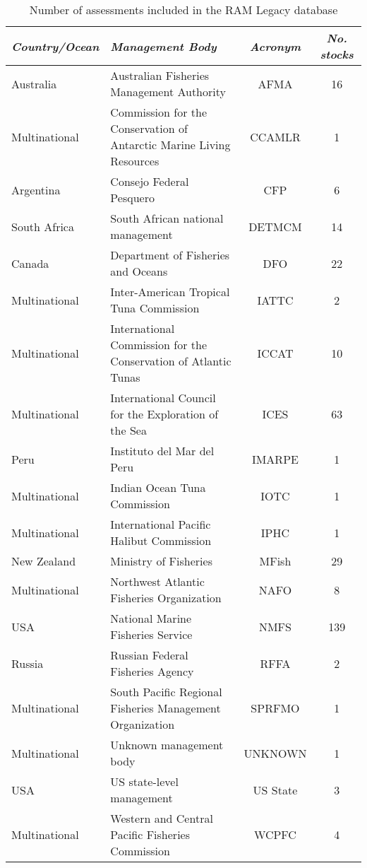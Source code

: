 \begin{table}[ht]
\begin{center}
\caption{Number of assessments included in the RAM Legacy database}
\label{tab:mgmt}
\begin{tabular}{p{3cm}p{5cm}cc}
\textit{Country/Ocean} & \textit{Management Body} & \textit{Acronym} & \textit{No. stocks} \\ \midrule
Australia & Australian Fisheries Management Authority & AFMA &  16 \\ 
  Multinational & Commission for the Conservation of Antarctic Marine Living Resources & CCAMLR &   1 \\ 
  Argentina & Consejo Federal Pesquero & CFP &   6 \\ 
  South Africa & South African national management & DETMCM &  14 \\ 
  Canada & Department of Fisheries and Oceans & DFO &  22 \\ 
  Multinational & Inter-American Tropical Tuna Commission & IATTC &   2 \\ 
  Multinational & International Commission for the Conservation of Atlantic Tunas & ICCAT &  10 \\ 
  Multinational & International Council for the Exploration of the Sea & ICES &  63 \\ 
  Peru & Instituto del Mar del Peru & IMARPE &   1 \\ 
  Multinational & Indian Ocean Tuna Commission & IOTC &   1 \\ 
  Multinational & International Pacific Halibut Commission & IPHC &   1 \\ 
  New Zealand & Ministry of Fisheries & MFish &  29 \\ 
  Multinational & Northwest Atlantic Fisheries Organization & NAFO &   8 \\ 
  USA & National Marine Fisheries Service & NMFS & 139 \\ 
  Russia & Russian Federal Fisheries Agency & RFFA &   2 \\ 
  Multinational & South Pacific Regional Fisheries Management Organization & SPRFMO &   1 \\ 
  Multinational & Unknown management body & UNKNOWN &   1 \\ 
  USA & US state-level management & US State &   3 \\ 
  Multinational & Western and Central Pacific Fisheries Commission & WCPFC &   4 \\ 
   \hline
\end{tabular}
\end{center}
\end{table}
